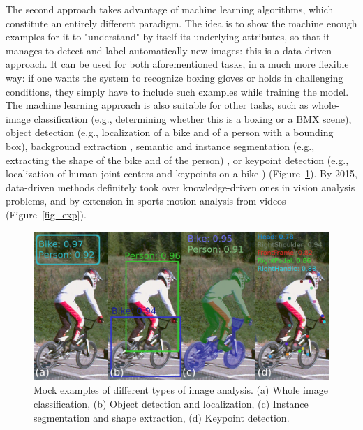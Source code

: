 
The second approach takes advantage of machine learning algorithms, which constitute an entirely different paradigm. The idea is to show the machine enough examples for it to "understand" by itself its underlying attributes, so that it manages to detect and label automatically new images: this is a data-driven approach. It can be used for both aforementioned tasks, in a much more flexible way: if one wants the system to recognize boxing gloves or holds in challenging conditions, they simply have to include such examples while training the model. The machine learning approach is also suitable for other tasks, such as whole-image classification (e.g., determining whether this is a boxing or a BMX scene), object detection (e.g., localization of a bike and of a person with a bounding box), background extraction \cite{Bouwmans2019}, semantic and instance segmentation (e.g., extracting the shape of the bike and of the person) \cite{Minaee2021}, or keypoint detection (e.g., localization of human joint centers and keypoints on a bike \cite{Chen2020a}) (Figure~\ref{fig_classif_detec}). By 2015, data-driven methods definitely took over knowledge-driven ones in vision analysis problems, and by extension in sports motion analysis from videos (Figure~\ref{fig_exp}).

\clearpage
\begin{figure}[!ht]
	\centering
	\def\svgwidth{1\columnwidth}
	\fontsize{10pt}{10pt}\selectfont
	\includegraphics[width=\linewidth]{"../Chap2/Figures/Fig_classif_detec.png"}
	\caption{Mock examples of different types of image analysis. (a) Whole image classification, (b) Object detection and localization, (c) Instance segmentation and shape extraction, (d) Keypoint detection.}
	\label{fig_classif_detec}
\end{figure}

